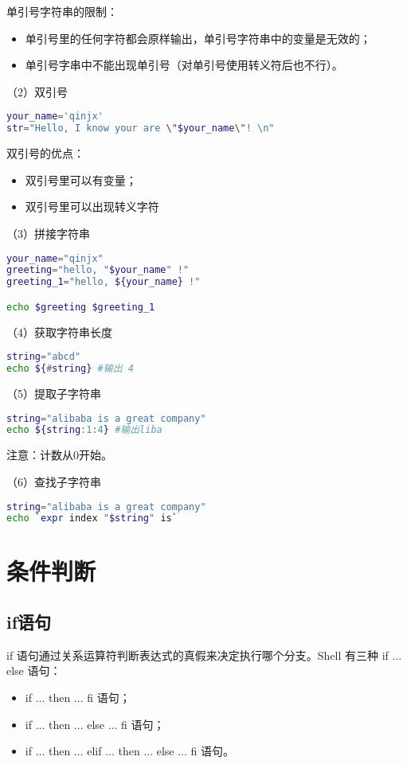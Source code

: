 单引号字符串的限制：
\begin{itemize}
\item 单引号里的任何字符都会原样输出，单引号字符串中的变量是无效的；
\item 单引号字串中不能出现单引号（对单引号使用转义符后也不行）。
\end{itemize}

（2）双引号
\begin{lstlisting}[language=sh]
your_name='qinjx'
str="Hello, I know your are \"$your_name\"! \n"
\end{lstlisting}

双引号的优点：
\begin{itemize}
\item 双引号里可以有变量；
\item 双引号里可以出现转义字符
\end{itemize}

（3）拼接字符串
\begin{lstlisting}[language=sh]
your_name="qinjx"
greeting="hello, "$your_name" !"
greeting_1="hello, ${your_name} !"

echo $greeting $greeting_1
\end{lstlisting}

（4）获取字符串长度
\begin{lstlisting}[language=sh]
string="abcd"
echo ${#string} #输出 4
\end{lstlisting}

（5）提取子字符串
\begin{lstlisting}[language=sh]
string="alibaba is a great company"
echo ${string:1:4} #输出liba
\end{lstlisting}
注意：计数从0开始。

（6）查找子字符串
\begin{lstlisting}[language=sh]
string="alibaba is a great company"
echo `expr index "$string" is`
\end{lstlisting}


\section{条件判断}
\subsection{if语句}
if 语句通过关系运算符判断表达式的真假来决定执行哪个分支。Shell 有三种 if ... else 语句：
\begin{itemize}
\item if ... then ... fi 语句；
\item if ... then ... else ... fi 语句；
\item if ... then ... elif ... then ... else ... fi 语句。
\end{itemize}

